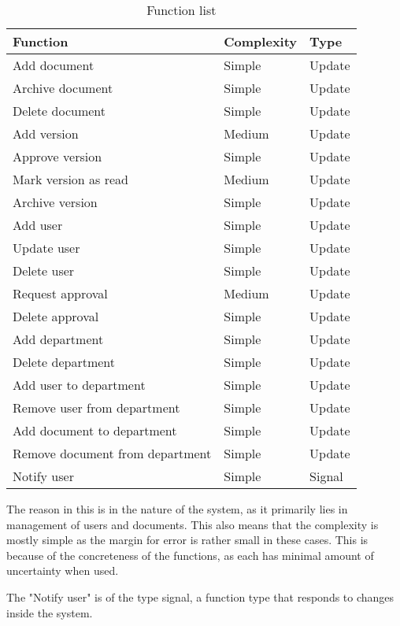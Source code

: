 \begin{table}[H]
\centering
\begin{tabular}{lll}
	\hline
	Function						& Complexity & Type    \\
	\hline
	Add document					& Simple     & Update  \\
	Archive document				& Simple     & Update  \\
	Delete document					& Simple     & Update  \\
	Add version						& Medium	 & Update  \\
	Approve version					& Simple     & Update  \\
	Mark version as read			& Medium     & Update  \\ 
	Archive version					& Simple     & Update  \\
	Add user						& Simple     & Update  \\
	Update user						& Simple     & Update  \\
	Delete user						& Simple     & Update  \\
	Request approval				& Medium     & Update  \\
	Delete approval					& Simple     & Update  \\
	Add department					& Simple     & Update  \\
	Delete department				& Simple	 & Update  \\
	Add user to department			& Simple     & Update  \\
	Remove user from department		& Simple     & Update  \\
	Add document to department		& Simple     & Update  \\
	Remove document from department & Simple     & Update  \\
	Notify user						& Simple	 & Signal  \\
	\hline
\end{tabular}
\caption{Function list}
\end{table}

The reason in this is in the nature of the system, as it primarily lies in management of users and documents.
This also means that the complexity is mostly simple as the margin for error is rather small in these cases.
This is because of the concreteness of the functions, as each has minimal amount of uncertainty when used.


The "Notify user" is of the type signal, a function type that responds to changes inside the system.


